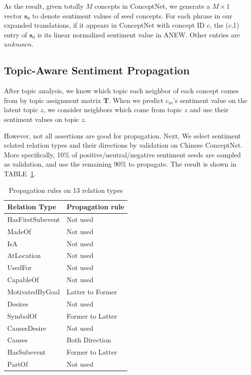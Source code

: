 As the result, given totally $M$ concepts in ConceptNet, we generate a $M \times 1$ vector $\boldsymbol{s}_0$ to denote sentiment values of seed concepts. For each phrase in our expanded translations, if it appears in ConceptNet with concept ID $c$, the ($c$,1) entry of $\boldsymbol{s}_0$ is its linear normalized sentiment value in ANEW. Other entries are $unknown$.

\subsection{Topic-Aware Sentiment Propagation}
After topic analysis, we know which topic each neighbor of each concept comes from by topic assignment matrix $\boldsymbol{T}$. When we predict $c_m$'s sentiment value on the latent topic $z$, we consider neighbors which come from topic $z$ and use their sentiment values on topic $z$. 

However, not all assertions are good for propagation. Next, We select sentiment related relation types and their directions by validation on Chinese ConceptNet. More specifically, 10\% of positive/neutral/negative sentiment seeds are sampled as validation, and use the remaining 90\% to propagate. The result is shown in TABLE~\ref{table:relRule}.

\begin{table}[!t]
\centering
\caption{Propagation rules on 13 relation types}
\label{table:relRule}
\begin{tabular}{|l|l|}
\hline
Relation Type    & Propagation rule  \\ \hline
HasFirstSubevent & Not used  		 \\ \hline
MadeOf 			 & Not used  		 \\ \hline
IsA 			 & Not used  		 \\ \hline
AtLocation 		 & Not used  		 \\ \hline
UsedFor 		 & Not used  		 \\ \hline
CapableOf 		 & Not used  		 \\ \hline
MotivatedByGoal  & Latter to Former  \\ \hline
Desires 		 & Not used          \\ \hline
SymbolOf 		 & Former to Latter  \\ \hline
CausesDesire 	 & Not used  		 \\ \hline
Causes 			 & Both Direction    \\ \hline
HasSubevent      & Former to Latter  \\ \hline
PartOf           & Not used  		 \\ \hline
\end{tabular}
\end{table}

